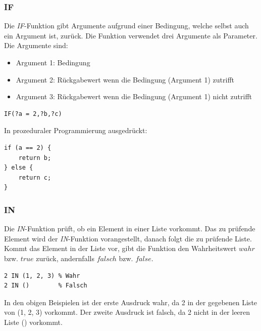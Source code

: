 \subsubsection{IF}
\label{ssubsec:sparql_ausdruecke_funktionen_if}
Die \textit{IF}-Funktion gibt Argumente aufgrund einer Bedingung, welche selbst auch ein Argument ist, zurück. Die Funktion verwendet drei Argumente als Parameter. Die Argumente sind:
\begin{itemize}
    \item Argument 1: Bedingung
    \item Argument 2: Rückgabewert wenn die Bedingung (Argument 1) zutrifft
    \item Argument 3: Rückgabewert wenn die Bedingung (Argument 1) nicht zutrifft
\end{itemize}

\begin{lstlisting}
IF(?a = 2,?b,?c)
\end{lstlisting}

In prozeduraler Programmierung ausgedrückt:
\begin{lstlisting}
if (a == 2) {
    return b;
} else {
    return c;
}
\end{lstlisting}

\subsubsection{IN}
\label{subsec:sparql_ausdruecke_funktionen_in}
Die \textit{IN}-Funktion prüft, ob ein Element in einer Liste vorkommt. Das zu prüfende Element wird der \textit{IN}-Funktion vorangestellt, danach folgt die zu prüfende Liste. Kommt das Element in der Liste vor, gibt die Funktion den Wahrheitswert $wahr$ bzw. $true$ zurück, andernfalls $falsch$ bzw. $false$.

\begin{lstlisting}
2 IN (1, 2, 3) % Wahr
2 IN ()        % Falsch
\end{lstlisting}
In den obigen Beispielen ist der erste Ausdruck wahr, da 2 in der gegebenen Liste von (1, 2, 3) vorkommt. Der zweite Ausdruck ist falsch, da 2 nicht in der leeren Liste () vorkommt.

